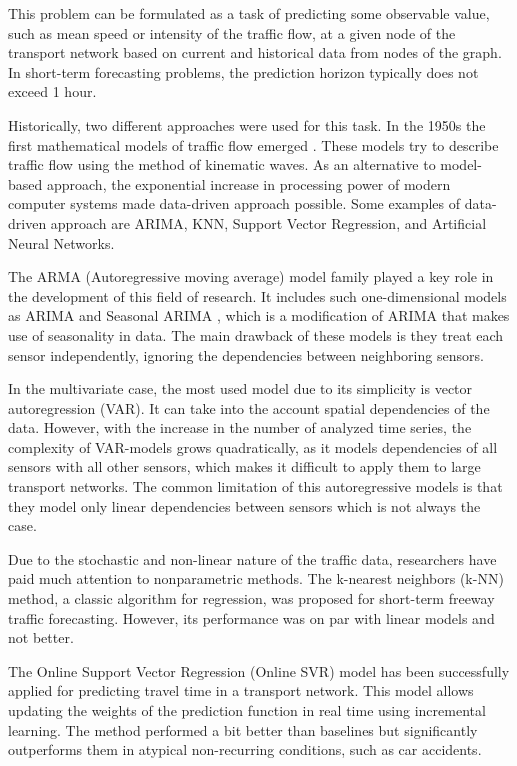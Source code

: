 \documentclass[letterpaper, 10 pt, conference]{ieeeconf}  %
\begin{document}
This problem can be formulated as a task of predicting some observable value, such as mean speed or intensity of the traffic flow, at a given node of the transport network based on current and historical data from nodes of the graph. In short-term forecasting problems, the prediction horizon typically does not exceed 1 hour.

Historically, two different approaches were used for this task. In the 1950s the first mathematical models of traffic flow emerged \cite{Richards1956, Lighthill1955}. These models try to describe traffic flow using the method of kinematic waves. As an alternative to model-based approach, the exponential increase in processing power of modern computer systems made data-driven approach possible.  Some examples of data-driven approach are ARIMA, KNN, Support Vector Regression, and Artificial Neural Networks.

The ARMA (Autoregressive moving average) model family played a key role in the development of this field of research. It includes such one-dimensional models as ARIMA \cite{Ahmed1979} and Seasonal ARIMA \cite{Williams2003}, which is a modification of ARIMA that makes use of seasonality in data. The main drawback of these models is they treat each sensor independently, ignoring the dependencies between neighboring sensors.

In the multivariate case, the most used model due to its simplicity is vector autoregression (VAR). It can take into the account spatial dependencies of the data. However, with the increase in the number of analyzed time series, the complexity of VAR-models grows quadratically, as it models dependencies of all sensors with all other sensors, which makes it difficult to apply them to large transport networks. The common limitation of this autoregressive models is that they model only linear dependencies between sensors which is not always the case.

Due to the stochastic and non-linear nature of the traffic data, researchers have paid much attention to nonparametric methods. The k-nearest neighbors (k-NN) method, a classic algorithm for regression, was proposed \cite{Davis1991} for short-term freeway traffic forecasting. However, its performance was on par with linear models and not better.

The Online Support Vector Regression (Online SVR) model \cite{Castro-Neto2009} has been successfully applied for predicting travel time in a transport network. This model allows updating the weights of the prediction function in real time using incremental learning. The method performed a bit better than baselines but significantly outperforms them in atypical non-recurring conditions, such as car accidents.
\end{document}
